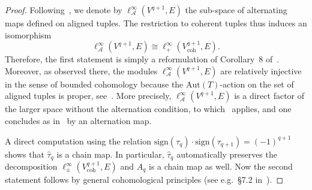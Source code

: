 \documentclass[11pt, a4paper]{amsart}
\newcommand{\ellal}{\ell^\infty_\mathscr{A}}
\newcommand{\Aut}{\mathrm{Aut}}
\newcommand{\coh}[1]{V_\mathrm{coh}^{#1}}
\theoremstyle{plain}
\begin{document}
\begin{proof}
Following~\cite{Bucher-Monod_tree_inpress}, we denote by $\ellal(V^{q+1}, E)$ the sub-space of alternating maps defined on aligned tuples. The restriction to coherent tuples thus induces an isomorphism
%
$$\ellal(V^{q+1}, E) \cong \ell^\infty_+(\coh{q+1}, E).$$
%
Therefore, the first statement is simply a reformulation of Corollary~8 of~\cite{Bucher-Monod_tree_inpress}. Moreover, as observed there, the modules $\ellal(V^{q+1}, E)$ are relatively injective in the sense of bounded cohomology because the $\Aut(T)$-action on the set of aligned tuples is proper, see~\cite[4.5.2]{Monod}. More precisely, $\ellal(V^{q+1}, E)$ is a direct factor of the larger space without the alternation condition, to which~\cite[4.5.2]{Monod} applies, and one concludes as in~\cite[7.4.5]{Monod} by an alternation map.

A direct computation using the relation $ \mathrm{sign}(\tau_q ) \cdot \mathrm{sign}(\tau_{q+1}) = (-1)^{q+1}$ shows that $\hat\tau_q$ is a chain map. In particular, $\hat\tau_q$ automatically preserves the decomposition $\ell^\infty_\pm(\coh{q+1}, E)$ and $A_q$ is a chain map as well. Now the second statement follows by general cohomological principles (see e.g.\ \S7.2 in~\cite{Monod}).
\end{proof}
\end{document}
